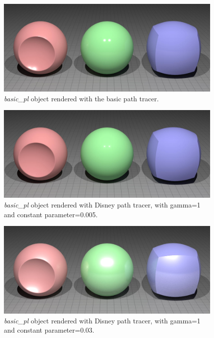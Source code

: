 \documentclass[11pt]{article}
\begin{document}
\newpage
\begin{figure}[H]
	\centering
	\includegraphics[scale=0.17]{img/obj/basic_pl/basic_pl.jpg}
	\caption{\textit{basic\_pl} object rendered with the basic path tracer.}
	\label{fig:basic}
\end{figure}
\begin{figure}[H]
	\centering
	\includegraphics[scale=0.17]{img/obj/basic_pl/basic_pl_disney_dg1_dc005.jpg}
	\caption{\textit{basic\_pl} object rendered with Disney path tracer, with gamma=1 and constant parameter=0.005.}
	\label{fig:105}
\end{figure}
\begin{figure}[H]
	\centering
	\includegraphics[scale=0.17]{img/obj/basic_pl/basic_pl_disney_dc03_dg1.jpg}
	\caption{\textit{basic\_pl} object rendered with Disney path tracer, with gamma=1 and constant parameter=0.03.}
	\label{fig:103}
\end{figure}
\end{document}
